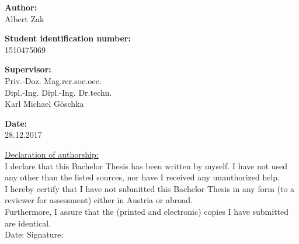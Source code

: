 \begin{center}
  \vspace{2cm}

  \hspace*{-1.0cm} \textbf{Author:} \\
  \vspace{0.2cm}
  \hspace*{-1.0cm} Albert Zak \\
  \vspace{0.7cm}

  \hspace*{-1.0cm} \textbf{Student identification number:}  \\
  \vspace{0.2cm}
  \hspace*{-1.0cm} 1510475069 \\
  \vspace{0.7cm}

  \hspace*{-1.0cm} \textbf{Supervisor:} \\
  \vspace{0.2cm}
  \hspace*{-1.0cm} Priv.-Doz. Mag.rer.soc.oec.\\
  \hspace*{-1.0cm} Dipl.-Ing. Dipl.-Ing. Dr.techn.\\
  \hspace*{-1.0cm} Karl Michael Göschka \\
  \vspace{0.7cm}

  \hspace*{-1.0cm} \textbf{Date:} \\
  \vspace{0.2cm}
  \hspace*{-1.0cm} 28.12.2017 \\

\end{center}

\newpage

\vspace*{16cm}
\begin{flushleft}
  \underline{Declaration of authorship:}\\
  \vspace{0.5cm}
  I declare that this Bachelor Thesis has been written by myself. I have not used any other than the listed sources, nor have I received any unauthorized help.\\
  \vspace{0.5cm}
  I hereby certify that I have not submitted this Bachelor Thesis in any form (to a reviewer for assessment) either in Austria or abroad.\\
  \vspace{0.5cm}
  Furthermore, I assure that the (printed and electronic) copies I have submitted are identical.\\
  \vspace{1cm}
  Date: \hspace{5.3cm} Signature:
\end{flushleft}
